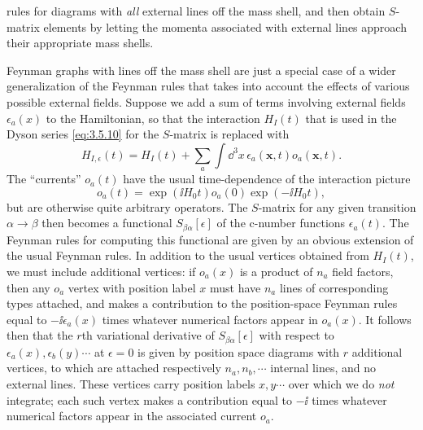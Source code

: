 rules for diagrams with \textit{all} external lines off the mass shell, and then
obtain $S$-matrix elements by letting the momenta associated with external
lines approach their appropriate mass shells.

Feynman graphs with lines off the mass shell are just a special case of a wider
generalization of the Feynman rules that takes into account the effects of
various possible external fields. Suppose we add a sum of terms involving
external fields $\epsilon_a(x)$ to the Hamiltonian, so that the interaction
$H_I(t)$ that is used in the Dyson series \eqref{eq:3.5.10} for the $S$-matrix is
replaced with
\begin{equation}
H_{I,\epsilon}(t)=H_I(t)+\sum_a\int \dd^3x\,
\epsilon_a(\mathbf x,t)o_a(\mathbf x,t).
\tag{6.4.1}
\label{eq:6.4.1}
\end{equation}
The ``currents'' $o_a(t)$ have the usual time-dependence of the interaction
picture
\begin{equation}
o_a(t)=\exp(\ii H_0t)o_a(0)\exp(-\ii H_0t),
\tag{6.4.2}
\label{eq:6.4.2}
\end{equation}
but are otherwise quite arbitrary operators. The $S$-matrix for any given
transition $\alpha\to\beta$ then becomes a functional $S_{\beta\alpha}[\epsilon]$
of the c-number functions $\epsilon_a(t)$. The Feynman rules for computing this
functional are given by an obvious extension of the usual Feynman rules. In
addition to the usual vertices obtained from $H_I(t)$, we must include
additional vertices: if $o_a(x)$ is a product of $n_a$ field factors, then any
$o_a$ vertex with position label $x$ must have $n_a$ lines of corresponding
types attached, and makes a contribution to the position-space Feynman rules
equal to $-\ii\epsilon_a(x)$ times whatever numerical factors appear in $o_a(x)$.
It follows then that the $r$th variational derivative of
$S_{\beta\alpha}[\epsilon]$ with respect to
$\epsilon_a(x),\epsilon_b(y)\cdots$ at $\epsilon=0$ is given by position space
diagrams with $r$ additional vertices, to which are attached respectively
$n_a,n_b,\cdots$ internal lines, and no external lines. These vertices carry
position labels $x,y\cdots$ over which we do \textit{not} integrate; each such
vertex makes a contribution equal to $-\ii$ times whatever numerical factors
appear in the associated current $o_a$.

